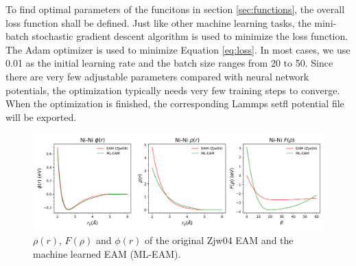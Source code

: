 \documentclass[final,3p,times]{elsarticle}
\begin{document}
To find optimal parameters of the funcitons in section \ref{sec:functions}, the 
overall loss function shall be defined. Just like other machine learning tasks, 
the mini-batch stochastic gradient descent algorithm is used to minimize the 
loss function. 
The Adam optimizer \cite{adam} is used to minimize Equation \ref{eq:loss}. 
In most cases, we use 0.01 as the initial learning rate and the batch size 
ranges from 20 to 50. Since there are very few adjustable parameters compared 
with neural network potentials, the optimization typically needs very few 
training steps to converge. When the optimization is finished, the corresponding 
Lammps setfl potential file will be exported.

% 
%
\begin{figure}
\centering
\includegraphics[scale=0.4]{Ni_eam.png}
\caption{\label{fig:Ni_eam} $\rho(r)$, $F(\rho)$ and $\phi(r)$ of the original 
Zjw04 EAM and the machine learned EAM (ML-EAM).}
\end{figure}
\end{document}
